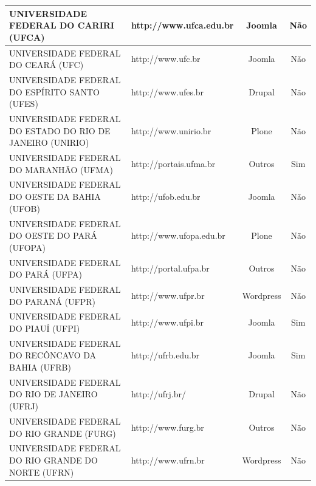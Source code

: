 \begin{quadro}[htb]
{\begin{tabular}{|l|l|c|c|}
			UNIVERSIDADE FEDERAL DO CARIRI (UFCA)                                          & http://www.ufca.edu.br            & Joomla    & Não           \\ \hline
			UNIVERSIDADE FEDERAL DO CEARÁ (UFC)                                            & http://www.ufc.br                 & Joomla    & Não           \\ \hline
			UNIVERSIDADE FEDERAL DO ESPÍRITO SANTO (UFES)                                  & http://www.ufes.br                & Drupal    & Não           \\ \hline
			UNIVERSIDADE FEDERAL DO ESTADO DO RIO DE JANEIRO (UNIRIO)                      & http://www.unirio.br              & Plone     & Não           \\ \hline
			UNIVERSIDADE FEDERAL DO MARANHÃO (UFMA)                                        & http://portais.ufma.br            & Outros    & Sim           \\ \hline
			UNIVERSIDADE FEDERAL DO OESTE DA BAHIA (UFOB)                                  & http://ufob.edu.br                & Joomla    & Não           \\ \hline
			UNIVERSIDADE FEDERAL DO OESTE DO PARÁ (UFOPA)                                  & http://www.ufopa.edu.br           & Plone     & Não           \\ \hline
			UNIVERSIDADE FEDERAL DO PARÁ (UFPA)                                            & http://portal.ufpa.br             & Outros    & Não           \\ \hline
			UNIVERSIDADE FEDERAL DO PARANÁ (UFPR)                                          & http://www.ufpr.br                & Wordpress & Não           \\ \hline
			UNIVERSIDADE FEDERAL DO PIAUÍ (UFPI)                                           & http://www.ufpi.br                & Joomla    & Sim           \\ \hline
			UNIVERSIDADE FEDERAL DO RECÔNCAVO DA BAHIA (UFRB)                              & http://ufrb.edu.br                & Joomla    & Sim           \\ \hline
			UNIVERSIDADE FEDERAL DO RIO DE JANEIRO (UFRJ)                                  & http://ufrj.br/                   & Drupal    & Não           \\ \hline
			UNIVERSIDADE FEDERAL DO RIO GRANDE (FURG)                                      & http://www.furg.br                & Outros    & Não           \\ \hline
			UNIVERSIDADE FEDERAL DO RIO GRANDE DO NORTE (UFRN)                             & http://www.ufrn.br                & Wordpress & Não           \\ \hline

\end{tabular}}
\end{quadro}
